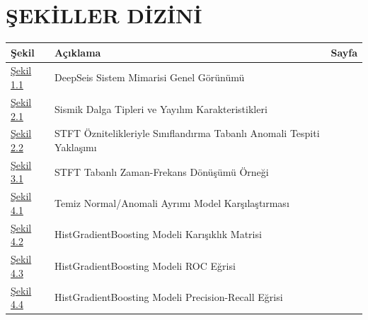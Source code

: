\chapter*{ŞEKİLLER DİZİNİ}

\begin{longtable}{p{2cm}p{11cm}r}
\textbf{Şekil} & \textbf{Açıklama} & \textbf{Sayfa} \\ \hline
\hyperref[fig:sistem_mimarisi]{Şekil 1.1} & DeepSeis Sistem Mimarisi Genel Görünümü & \pageref{fig:sistem_mimarisi} \\
\hyperref[fig:sismik_dalgalar]{Şekil 2.1} & Sismik Dalga Tipleri ve Yayılım Karakteristikleri & \pageref{fig:sismik_dalgalar} \\
\hyperref[fig:ml_anomaly_pipeline]{Şekil 2.2} & STFT Öznitelikleriyle Sınıflandırma Tabanlı Anomali Tespiti Yaklaşımı & \pageref{fig:ml_anomaly_pipeline} \\
\hyperref[fig:stft_ornek]{Şekil 3.1} & STFT Tabanlı Zaman-Frekans Dönüşümü Örneği & \pageref{fig:stft_ornek} \\
\hyperref[fig:clean_model_comparison]{Şekil 4.1} & Temiz Normal/Anomali Ayrımı Model Karşılaştırması & \pageref{fig:clean_model_comparison} \\
\hyperref[fig:clean_confusion]{Şekil 4.2} & HistGradientBoosting Modeli Karışıklık Matrisi & \pageref{fig:clean_confusion} \\
\hyperref[fig:clean_roc]{Şekil 4.3} & HistGradientBoosting Modeli ROC Eğrisi & \pageref{fig:clean_roc} \\
\hyperref[fig:clean_pr]{Şekil 4.4} & HistGradientBoosting Modeli Precision-Recall Eğrisi & \pageref{fig:clean_pr} \\
\end{longtable}
